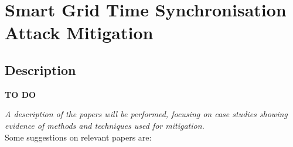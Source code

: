 
\chapter[Smart Grid TSA Mitigation]{Smart Grid Time Synchronisation  Attack Mitigation}

\section{Description}

    
\textbf{TO DO}

\textit{A description of the papers will be performed, focusing on case studies showing evidence of methods and techniques used for mitigation.}  \\ 



Some suggestions on relevant papers are:

